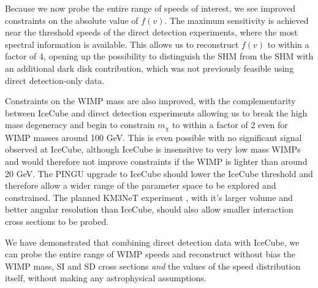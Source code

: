 Because we now probe the entire range of speeds of interest, we see improved constraints on the absolute value of $f(v)$. The maximum sensitivity is achieved near the threshold speeds of the direct detection experiments, where the most spectral information is available. This allows us to reconstruct $f(v)$ to within a factor of 4, opening up the possibility to distinguish the SHM from the SHM with an additional dark disk contribution, which was not previously feasible using direct detection-only data.

Constraints on the WIMP mass are also improved, with the complementarity between IceCube and direct detection experiments allowing us to break the high mass degeneracy and begin to constrain $m_\chi$ to within a factor of 2 even for WIMP masses around 100 GeV. This is even possible with no significant signal observed at IceCube, although IceCube is insensitive to very low mass WIMPs and would therefore not improve constraints if the WIMP is lighter than around 20 GeV. The PINGU upgrade to IceCube \cite{Aartsen:2014} should lower the IceCube threshold and therefore allow a wider range of the parameter space to be explored and constrained. The planned KM3NeT experiment \cite{Biagi:2012}, with it's larger volume and better angular resolution than IceCube, should also allow smaller interaction cross sections to be probed.

We have demonstrated that combining direct detection data with IceCube, we can probe the entire range of WIMP speeds and reconstruct without bias the WIMP mass, SI and SD cross sections \textit{and} the values of the speed distribution itself, without making any astrophysical assumptions.




